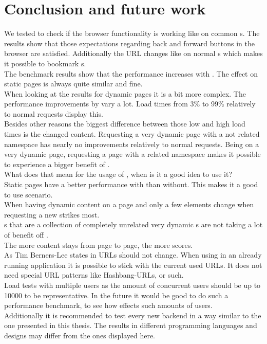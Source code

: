 \section{Conclusion and future work\label{chap:conclusion}}

We tested \lare{} to check if the browser functionality is working like on common \webApplication{}s.
The results show that those expectations regarding back and forward buttons in the browser are satisfied.
Additionally the URL changes like on normal \webApplication{}s which makes it possible to bookmark \webPage{}s.
\\
The benchmark results show that the performance increases with \lare{}.
The effect on static pages is always quite similar and fine.
\\
When looking at the results for dynamic pages it is a bit more complex.
The performance improvements by \lare{} vary a lot.
Load times from 3\% to 99\% relatively to normal requests display this.
\\
Besides other reasons the biggest difference between those low and high load times is the changed content.
Requesting a very dynamic page with a not related namespace has nearly no improvements relatively to normal requests.
Being on a very dynamic page, requesting a page with a related namespace makes it possible to experience a bigger benefit of \lare{}.
\\
What does that mean for the usage of \lare{}, when is it a good idea to use it?
\\
Static pages have a better performance with \lare{} than without.
This makes it a good to use scenario.
\\
When having dynamic content on a page and only a few elements change when requesting a new \webPage{} \lare{} strikes most.
\\
\WebSite{}s that are a collection of completely unrelated very dynamic \webPage{}s are not taking a lot of benefit off \lare{}.
\\
The more content stays from page to page, the more \lare{} scores.
\\
As Tim Berners-Lee states in \cite{berners1998cool} URLs should not change.
When using \lare{} in an already running application it is possible to stick with the current used URLs.
It does not need special URL patterns like Hashbang-URLs, or such.
\\
Load tests with multiple users as the amount of concurrent users should be up to 10000 to be representative\cite{bozdag2008performance}.
In the future it would be good to do such a performance benchmark, to see how \lare{} effects such amounts of users.
\\
Additionally it is recommended to test every new \lare{} backend in a way similar to the one presented in this thesis.
The results in different programming languages and \webApplication{} designs may differ from the ones displayed here.
